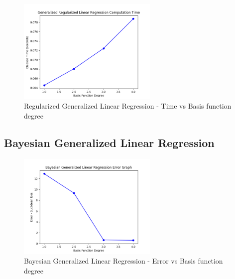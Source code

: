 \documentclass[parskip=full]{scrartcl}
\begin{document}
        \begin{figure}[ht]
            \centering
            \includegraphics[width=0.6\textwidth]{3a_degree_vs_time.png}
            \caption{Regularized Generalized Linear Regression - Time vs Basis function degree}
            \label{fig:rglg_time_v_deg}
        \end{figure}


    \subsection{Bayesian Generalized Linear Regression} %
    \label{sub:bayesian_generalized_linear_regression}
    
        \begin{figure}[ht]
            \centering
            \includegraphics[width=0.6\textwidth]{3b_degree_vs_error.png}
            \caption{Bayesian Generalized Linear Regression - Error vs Basis function degree}
            \label{fig:bglg_err_v_deg}
        \end{figure}
\end{document}
